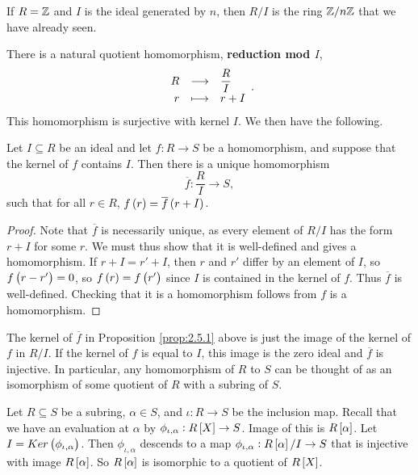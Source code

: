 \pagebreak

\begin{example*}
If $ R = \mathbb{Z} $ and $ I $ is the ideal generated by $ n $, then $ R / I $ is the ring $ \mathbb{Z} / n\mathbb{Z} $ that we have already seen.
\end{example*}

There is a natural quotient homomorphism, \textbf{reduction mod $ I $},
$$ \function{R}{\dfrac{R}{I}}{r}{r + I}. $$
This homomorphism is surjective with kernel $ I $. We then have the following.

\begin{proposition}
\label{prop:2.5.1}
Let $ I \subseteq R $ be an ideal and let $ f : R \to S $ be a homomorphism, and suppose that the kernel of $ f $ contains $ I $. Then there is a unique homomorphism
$$ \overline{f} : \dfrac{R}{I} \to S, $$
such that for all $ r \in R $, $ f\br{r} = \overline{f}\br{r + I} $.
\end{proposition}

\begin{proof}
Note that $ \overline{f} $ is necessarily unique, as every element of $ R / I $ has the form $ r + I $ for some $ r $. We must thus show that it is well-defined and gives a homomorphism. If $ r + I = r' + I $, then $ r $ and $ r' $ differ by an element of $ I $, so $ f\br{r - r'} = 0 $, so $ f\br{r} = f\br{r'} $ since $ I $ is contained in the kernel of $ f $. Thus $ \overline{f} $ is well-defined. Checking that it is a homomorphism follows from $ f $ is a homomorphism.
\end{proof}

\begin{note*}
The kernel of $ \overline{f} $ in Proposition \ref{prop:2.5.1} above is just the image of the kernel of $ f $ in $ R / I $. If the kernel of $ f $ is equal to $ I $, this image is the zero ideal and $ \overline{f} $ is injective. In particular, any homomorphism of $ R $ to $ S $ can be thought of as an isomorphism of some quotient of $ R $ with a subring of $ S $.
\end{note*}

\begin{example*}
Let $ R \subseteq S $ be a subring, $ \alpha \in S $, and $ \iota : R \to S $ be the inclusion map. Recall that we have an evaluation at $ \alpha $ by $ \phi_{\iota, \alpha} : R\sbr{X} \to S $. Image of this is $ R\sbr{\alpha} $. Let $ I = Ker\br{\phi_{\iota, \alpha}} $. Then $ \phi_{\iota, \alpha} $ descends to a map $ \phi_{\iota, \alpha} : R\sbr{\alpha} / I \to S $ that is injective with image $ R\sbr{\alpha} $. So $ R\sbr{\alpha} $ is isomorphic to a quotient of $ R\sbr{X} $.
\end{example*}

